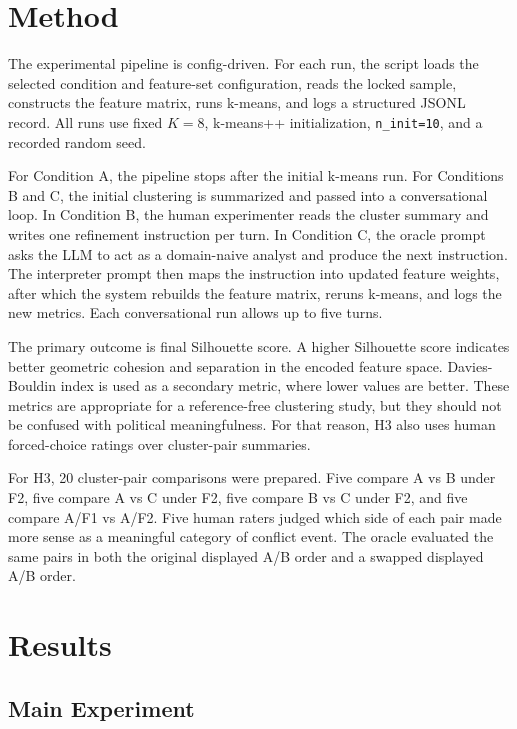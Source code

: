 \documentclass[11pt,a4paper]{article}
\begin{document}
\section{Method}

The experimental pipeline is config-driven. For each run, the script loads the selected condition and feature-set configuration, reads the locked sample, constructs the feature matrix, runs k-means, and logs a structured JSONL record. All runs use fixed $K=8$, k-means++ initialization, \texttt{n\_init=10}, and a recorded random seed.

For Condition A, the pipeline stops after the initial k-means run. For Conditions B and C, the initial clustering is summarized and passed into a conversational loop. In Condition B, the human experimenter reads the cluster summary and writes one refinement instruction per turn. In Condition C, the oracle prompt asks the LLM to act as a domain-naive analyst and produce the next instruction. The interpreter prompt then maps the instruction into updated feature weights, after which the system rebuilds the feature matrix, reruns k-means, and logs the new metrics. Each conversational run allows up to five turns.

The primary outcome is final Silhouette score. A higher Silhouette score indicates better geometric cohesion and separation in the encoded feature space. Davies-Bouldin index is used as a secondary metric, where lower values are better. These metrics are appropriate for a reference-free clustering study, but they should not be confused with political meaningfulness. For that reason, H3 also uses human forced-choice ratings over cluster-pair summaries.

For H3, 20 cluster-pair comparisons were prepared. Five compare A vs B under F2, five compare A vs C under F2, five compare B vs C under F2, and five compare A/F1 vs A/F2. Five human raters judged which side of each pair made more sense as a meaningful category of conflict event. The oracle evaluated the same pairs in both the original displayed A/B order and a swapped displayed A/B order.

\section{Results}

\subsection{Main Experiment}
\end{document}
